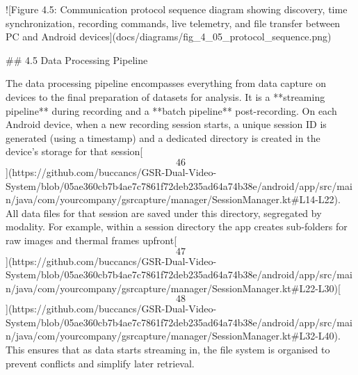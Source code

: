 \documentclass[12pt,a4paper]{article}
\begin{document}
{![Figure 4.5: Communication protocol sequence diagram showing discovery, time synchronization, recording commands, live telemetry, and file transfer between PC and Android devices](docs/diagrams/fig_4_05_protocol_sequence.png)

## 4.5 Data Processing Pipeline

The data processing pipeline encompasses everything from data capture on
devices to the final preparation of datasets for analysis. It is a
**streaming pipeline** during recording and a **batch pipeline**
post-recording. On each Android device, when a new recording session
starts, a unique session ID is generated (using a timestamp) and a
dedicated directory is created in the device's storage for that
session[\[46\]](https://github.com/buccancs/GSR-Dual-Video-System/blob/05ae360cb7b4ae7c7861f72deb235ad64a74b38e/android/app/src/main/java/com/yourcompany/gsrcapture/manager/SessionManager.kt#L14-L22).
All data files for that session are saved under this directory,
segregated by modality. For example, within a session directory the app
creates sub-folders for raw images and thermal frames
upfront[\[47\]](https://github.com/buccancs/GSR-Dual-Video-System/blob/05ae360cb7b4ae7c7861f72deb235ad64a74b38e/android/app/src/main/java/com/yourcompany/gsrcapture/manager/SessionManager.kt#L22-L30)[\[48\]](https://github.com/buccancs/GSR-Dual-Video-System/blob/05ae360cb7b4ae7c7861f72deb235ad64a74b38e/android/app/src/main/java/com/yourcompany/gsrcapture/manager/SessionManager.kt#L32-L40).
This ensures that as data starts streaming in, the file system is
organised to prevent conflicts and simplify later retrieval.

}
\end{document}
